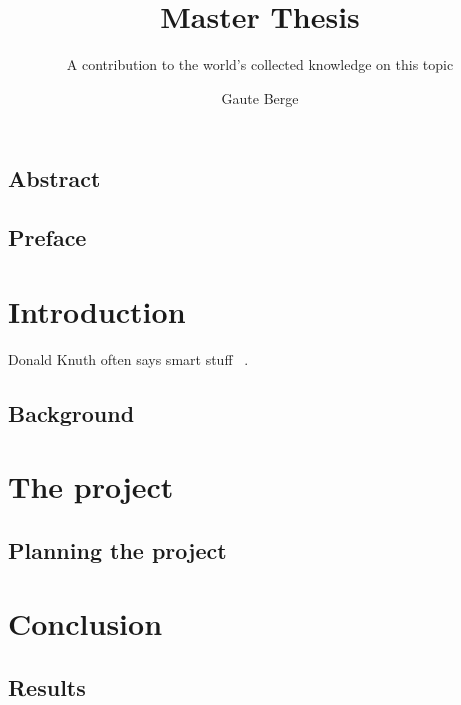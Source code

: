 \documentclass[a4paper,english]{ifimaster}
\title{Master Thesis}
\subtitle{A contribution to the world’s collected knowledge on this topic}
\author{Gaute Berge}
\begin{document}
\duoforside[dept={Department of Informatics},
program={Informatics: Language and Communication},
long]

\frontmatter{}
\chapter*{Abstract}

\tableofcontents{}
\listoffigures{}
\listoftables{}

\chapter*{Preface}

\mainmatter{}
\part{Introduction}

Donald Knuth often says smart stuff ~\parencite{Knuth:2007:CPA:1283920.1283929}.

\chapter{Background}

\part{The project}

\chapter{Planning the project}

\part{Conclusion}

\chapter{Results}

\backmatter{}

\printbibliography
\end{document}
